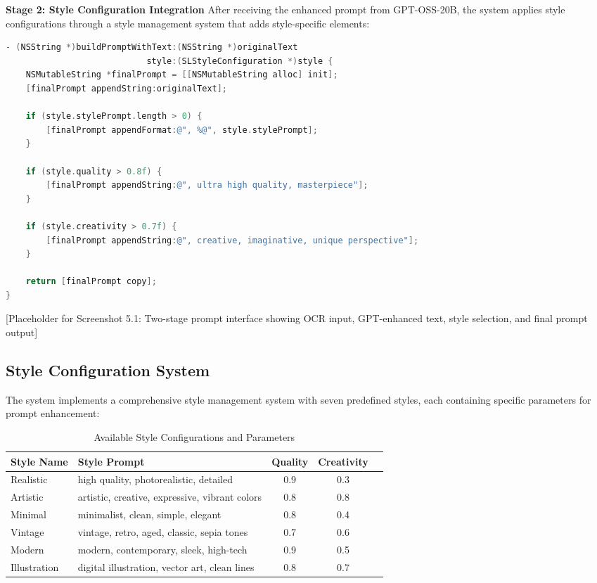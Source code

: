 \textbf{Stage 2: Style Configuration Integration}
After receiving the enhanced prompt from GPT-OSS-20B, the system applies style configurations through a style management system that adds style-specific elements:

\begin{lstlisting}[language=C,basicstyle=\footnotesize\ttfamily,frame=single,breaklines=true,columns=flexible,caption={Style Integration Implementation},label={lst:style_integration}]
- (NSString *)buildPromptWithText:(NSString *)originalText 
                            style:(SLStyleConfiguration *)style {
    NSMutableString *finalPrompt = [[NSMutableString alloc] init];
    [finalPrompt appendString:originalText];
    
    if (style.stylePrompt.length > 0) {
        [finalPrompt appendFormat:@", %@", style.stylePrompt];
    }
    
    if (style.quality > 0.8f) {
        [finalPrompt appendString:@", ultra high quality, masterpiece"];
    }
    
    if (style.creativity > 0.7f) {
        [finalPrompt appendString:@", creative, imaginative, unique perspective"];
    }
    
    return [finalPrompt copy];
}
\end{lstlisting}

[Placeholder for Screenshot 5.1: Two-stage prompt interface showing OCR input, GPT-enhanced text, style selection, and final prompt output]

\subsection{Style Configuration System}

The system implements a comprehensive style management system with seven predefined styles, each containing specific parameters for prompt enhancement:

\begin{table}[H]
\centering
\caption{Available Style Configurations and Parameters}
\label{tab:style_configurations}
{\begin{tabular}{llccc}
\toprule
\textbf{Style Name} & \textbf{Style Prompt} & \textbf{Quality} & \textbf{Creativity} \\
\midrule
Realistic & high quality, photorealistic, detailed & 0.9 & 0.3 \\
Artistic & artistic, creative, expressive, vibrant colors & 0.8 & 0.8 \\
Minimal & minimalist, clean, simple, elegant & 0.8 & 0.4  \\
Vintage & vintage, retro, aged, classic, sepia tones & 0.7 & 0.6  \\
Modern & modern, contemporary, sleek, high-tech & 0.9 & 0.5  \\
Illustration & digital illustration, vector art, clean lines & 0.8 & 0.7  \\
\bottomrule
\end{tabular}}
\end{table}

